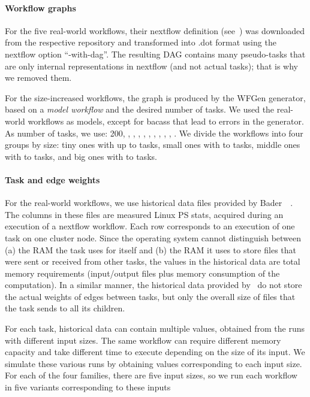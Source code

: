 \documentclass[conference]{IEEEtran}
\begin{document}
    \paragraph{Workflow graphs}
    For the five real-world workflows, their nextflow definition (see~\cite{ewels2020nf}) was downloaded from the
    respective repository and transformed into .dot format using the nextflow option ``-with-dag''.
    The resulting DAG contains many pseudo-tasks that are only internal representations in nextflow
    (and not actual tasks); that is why we removed them.

    For the size-increased workflows, the graph is produced by the WFGen generator, based on a {\em model workflow} and
    the desired number of tasks.
    We used the real-world workflows as models, except for bacass that lead to errors in the generator.
%
    As number of tasks, we use: 200, , , , , ,
    , , , , .
    We divide the workflows into four groups by size: tiny ones with up to  tasks, small ones with  to  tasks,
    middle ones with  to  tasks, and big ones with  to  tasks.

    \paragraph{Task and edge weights}
    For the real-world workflows, we use historical data files provided by Bader~\etal~\cite{lotaru}.
    The columns in these files are measured Linux PS stats, acquired during an execution of a nextflow workflow.
    Each row corresponds to an execution of one task on one cluster node.
    Since the operating system cannot distinguish between (a) the RAM the task uses for itself and (b) the RAM it uses
    to store files that were sent or received from other tasks, the values in the historical data are total memory requirements (input/output files plus memory consumption of the computation).
    In a similar manner, the historical data provided by~\cite{lotaru} do not store the actual weights of edges between tasks, but only the overall
    size of files that the task sends to all its children.

    For each task, historical data can contain multiple values, obtained from the runs with different input sizes.
    The same workflow can require different memory capacity and take different time to execute
    depending on the size of its input.
    We simulate these various runs by obtaining values corresponding to each input size.
    For each of the four families, there are five input sizes, so we run each workflow in five variants corresponding to these inputs
\end{document}
